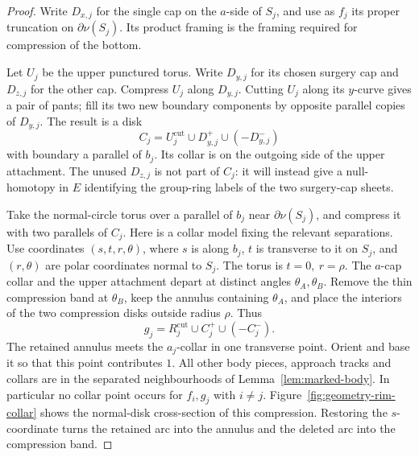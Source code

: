 \begin{proof}
Write \(D_{x,j}\) for the single cap on the \(a\)-side of \(S_j\), and use
as \(f_j\) its proper truncation on \(\partial\nu(S_j)\).
Its product framing is the framing
required for compression of the bottom.

Let \(U_j\) be the upper punctured torus. Write \(D_{y,j}\) for its chosen
surgery cap and \(D_{z,j}\) for the other cap. Compress \(U_j\) along
\(D_{y,j}\). Cutting \(U_j\) along its \(y\)-curve gives a pair of pants;
fill its two new boundary components by opposite parallel copies of
\(D_{y,j}\). The result is a disk
\begin{equation}
\label{eq:one-sided-contraction}
 C_j=U_j^{\mathrm{cut}}\cup D_{y,j}^{+}\cup(-D_{y,j}^{-})
\end{equation}
with boundary a parallel of \(b_j\). Its collar is on the outgoing side
of the upper attachment. The unused \(D_{z,j}\) is not part of \(C_j\):
it will instead give a null-homotopy in \(E\) identifying the group-ring
labels of the two surgery-cap sheets.

Take the normal-circle torus over a parallel of \(b_j\) near
\(\partial\nu(S_j)\), and compress it with two parallels of \(C_j\).
Here is a collar model fixing the relevant separations. Use coordinates
\((s,t,r,\theta)\), where \(s\) is along \(b_j\), \(t\) is transverse to it
on \(S_j\), and \((r,\theta)\) are polar coordinates normal to \(S_j\).
The torus is \(t=0,\ r=\rho\). The \(a\)-cap collar and the upper attachment
depart at distinct angles \(\theta_A,\theta_B\).
Remove the thin compression band at \(\theta_B\), keep the annulus
containing \(\theta_A\), and place the interiors of the two compression
disks outside radius \(\rho\). Thus
\begin{equation}
\label{eq:compressed-rim-sphere}
 g_j=R_j^{\mathrm{cut}}\cup C_j^+\cup(-C_j^-).
\end{equation}
The retained annulus meets the \(a_j\)-collar in one transverse point.
Orient and base it so that this point contributes \(1\).
All other body pieces, approach tracks and collars are in the separated
neighbourhoods of Lemma~\ref{lem:marked-body}. In particular no collar
point occurs for \(f_i,g_j\) with \(i\ne j\).
Figure~\ref{fig:geometry-rim-collar} shows the normal-disk cross-section
of this compression. Restoring the \(s\)-coordinate turns the retained
arc into the annulus and the deleted arc into the compression band.




\end{proof}
